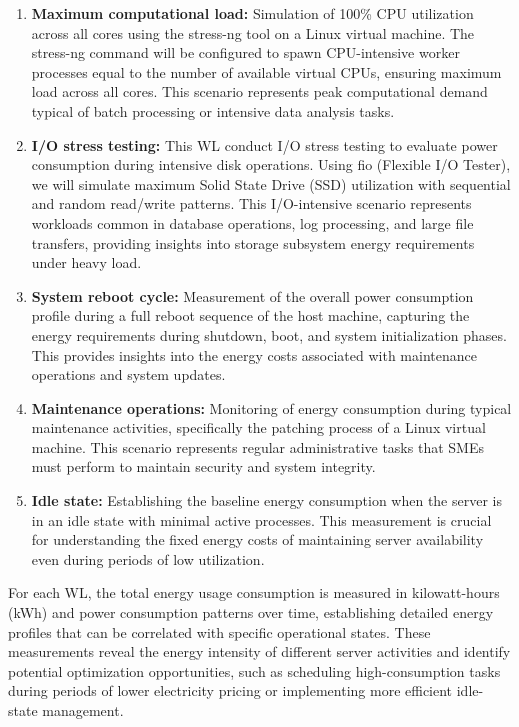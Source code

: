 \begin{enumerate}[label=WL\arabic*]
    \item \textbf{Maximum computational load:} Simulation of 100\% CPU utilization across all
    cores using the stress-ng tool on a Linux virtual machine. The stress-ng
    command will be configured to spawn CPU-intensive worker processes equal to
    the number of available virtual CPUs, ensuring maximum load across all cores.
    This scenario represents peak computational demand typical of batch processing
    or intensive data analysis tasks. \cite{stressng2020}

    \item \textbf{I/O stress testing:} This WL conduct I/O stress testing to evaluate
    power consumption during intensive disk operations. Using fio (Flexible I/O Tester),
    we will simulate maximum Solid State Drive (SSD) utilization with sequential and random read/write
    patterns. This I/O-intensive scenario represents workloads common in database operations,
    log processing, and large file transfers, providing insights into storage
    subsystem energy requirements under heavy load.

    \item \textbf{System reboot cycle:} Measurement of the overall power consumption profile
    during a full reboot sequence of the host machine, capturing the energy
    requirements during shutdown, boot, and system initialization phases. This
    provides insights into the energy costs associated with maintenance operations
    and system updates.

    \item \textbf{Maintenance operations:} Monitoring of energy consumption during typical
    maintenance activities, specifically the patching process of a Linux virtual
    machine. This scenario represents regular administrative tasks that SMEs must
    perform to maintain security and system integrity.

    \item \textbf{Idle state:} Establishing the baseline energy consumption when the server is
    in an idle state with minimal active processes. This measurement is crucial
    for understanding the fixed energy costs of maintaining server availability
    even during periods of low utilization. \cite{moran2024dissecting,agilewatts2022}
\end{enumerate}

For each WL, the total energy usage consumption is measured in kilowatt-hours (kWh) and power consumption patterns over time, establishing detailed energy profiles that can be correlated with specific operational states. These measurements reveal the energy intensity of different server activities and identify potential optimization opportunities, such as scheduling high-consumption tasks during periods of lower electricity pricing or implementing more efficient idle-state management.

